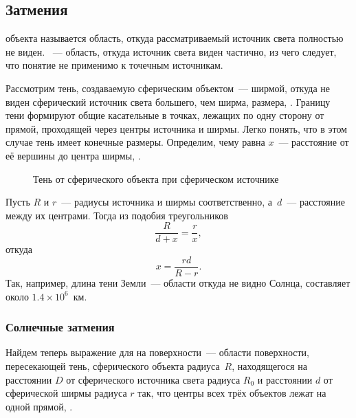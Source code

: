 \subsection{Затмения}
 объекта называется область, откуда рассматриваемый источник света полностью не виден. ~--- область, откуда источник света виден частично, из чего следует, что понятие  не применимо к точечным источникам.

Рассмотрим тень, создаваемую сферическим объектом~--- ширмой, откуда не виден сферический источник света большего, чем ширма, размера, . Границу тени формируют общие касательные в точках, лежащих по одну сторону от прямой, проходящей через центры источника и ширмы. Легко понять, что в этом случае тень имеет конечные размеры. Определим, чему равна  $x$~--- расстояние от её вершины до центра ширмы, .

\begin{figure}[h!]
    \centering
    
    \caption{Тень от сферического объекта при сферическом источнике}
    \label{pic:shadow-length}
\end{figure}

Пусть $R$ и $r$~--- радиусы источника и ширмы соответственно, а~$d$~--- расстояние между их центрами. Тогда из подобия треугольников
\begin{equation*}
    \frac{R}{d + x} = \frac{r}{x},
\end{equation*}
откуда
\begin{equation}
    x = \frac{r d}{R - r}.
    \label{eq:eclipses-shadow-length}
\end{equation}
Так, например, длина тени Земли~--- области откуда не видно Солнца, составляет около $1.4 \times 10^{6}$~км.

\subsubsection*{Солнечные затмения}

Найдем теперь выражение для  на поверхности~--- области поверхности, пересекающей тень, сферического объекта радиуса~$R$, находящегося на расстоянии  $D$ от сферического источника света радиуса $R_0$ и расстоянии $d$ от сферической ширмы радиуса $r$ так, что центры всех трёх объектов лежат на одной прямой, .

